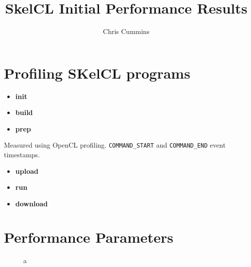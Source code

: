 
\title{SkelCL Initial Performance Results}

\author{Chris Cummins}





\maketitle

\begin{abstract}
  \noindent

\end{abstract}

\section{Profiling SKelCL programs}

\begin{itemize}
\item \textbf{init}
\item \textbf{build}
\item \textbf{prep}
\end{itemize}

Measured using OpenCL profiling. \texttt{COMMAND\_START} and
\texttt{COMMAND\_END} event timestamps.

\begin{itemize}
\item \textbf{upload}
\item \textbf{run}
\item \textbf{download}
\end{itemize}

\begin{figure}
\centering

\end{figure}

\section{Performance Parameters}

\begin{figure}


\caption{a}
\label{fig:}
\end{figure}

